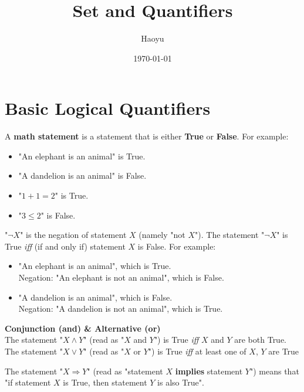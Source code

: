 \documentclass[main.tex]{subfiles}
\title{Set and Quantifiers}
\author{Haoyu}
\date{\today}
\begin{document}
\section{Basic Logical Quantifiers}

\begin{definition}
    A \textbf{math statement} is a statement that is either \textbf{True} or \textbf{False}. For example:
    \begin{itemize}
        \item "An elephant is an animal" is True.
        \item "A dandelion is an animal" is False.
        \item "$1+1=2$" is True.
        \item "$3 \le 2$" is False.
    \end{itemize}
\end{definition}

\begin{definition}
    "$\neg X$" is the negation of statement $X$ (namely "not $X$"). The statement "$\neg X$" is True \textit{iff} (if and only if) statement $X$ is False. For example:
    \begin{itemize}
        \item "An elephant is an animal", which is True.\\
        Negation: "An elephant is not an animal", which is False.
        \item "A dandelion is an animal", which is False.\\
        Negation: "A dandelion is not an animal", which is True.
    \end{itemize}
\end{definition}

\begin{definition} \textbf{Conjunction (and) & Alternative (or)}\\
    The statement "$X \wedge Y$" (read as "$X$ and $Y$") is True \textit{iff} $X$ and $Y$ are both True.\\
    The statement "$X \vee Y$" (read as "$X$ or $Y$") is True \textit{iff} at least one of $X$, $Y$ are True
\end{definition}

\begin{definition}
    The statement "$X \Rightarrow Y$" (read as "statement $X$ \textbf{implies} statement $Y$") means that "if statement $X$ is True, then statement $Y$ is also True".
\end{definition}
\end{document}
